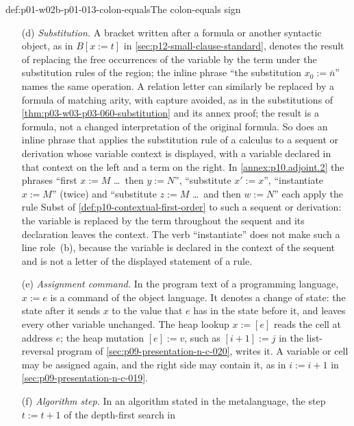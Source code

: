 \begin{hbconvention}{def:p01-w02b-p01-013-colon-equals}{The colon-equals sign}
\begin{enumerate}
  \(v_i\) to the domain element \(a_i\).  The displayed variables contain
  all free variables of \(\varphi\), so the other coordinates do not
  affect truth.  This is a semantic assignment specification; the domain
  elements need not be denoted by terms of the language.
  \item[(d)] \emph{Substitution.}  A bracket written after a formula or
  another syntactic object, as in \(B[x:=t]\) in
  \cref{sec:p12-small-clause-standard}, denotes the result of replacing the
  free occurrences of the variable by the term under the substitution rules
  of the region; the inline phrase ``the substitution \(x_0:=\bar n\)''
  names the same operation.  A relation letter can similarly be replaced
  by a formula of matching arity, with capture avoided, as in the
  substitutions of \cref{thm:p03-w03-p03-060-substitution} and its annex
  proof; the result is a formula, not a changed interpretation of the
  original formula.  So does an inline phrase that applies the
  substitution rule of a calculus to a sequent or derivation whose
  variable context is displayed, with a variable declared in that context
  on the left and a term on the right.  In \cref{annex:p10.adjoint.2} the
  phrases ``first \(x:=M\) \ldots\ then \(y:=N\)'', ``substitute
  \(x':=x\)'', ``instantiate \(x:=M\)'' (twice) and ``substitute \(z:=M\)
  \ldots\ and then \(w:=N\)'' each apply the rule Subst of
  \cref{def:p10-contextual-first-order} to such a sequent or derivation:
  the variable is replaced by the term throughout the sequent and its
  declaration leaves the context.  The verb ``instantiate'' does not make
  such a line role~(b), because the variable is declared in the context of
  the sequent and is not a letter of the displayed statement of a rule.
  \item[(e)] \emph{Assignment command.}  In the program text of a
  programming language, \(x:=e\) is a command of the object language.  It
  denotes a change of state: the state after it sends \(x\) to the value
  that \(e\) has in the state before it, and leaves every other variable
  unchanged.  The heap lookup \(x:=[e]\) reads the cell at address \(e\);
  the heap mutation \([e]:=v\), such as \([i+1]:=j\) in the list-reversal
  program of \cref{sec:p09-presentation-n-c-020}, writes it.  A variable or
  cell may be assigned again, and the right side may contain it, as in
  \(i:=i+1\) in \cref{sec:p09-presentation-n-c-019}.
  \item[(f)] \emph{Algorithm step.}  In an algorithm stated in the
  metalanguage, the step \(t:=t+1\) of the depth-first search in

\end{enumerate}
\end{hbconvention}

